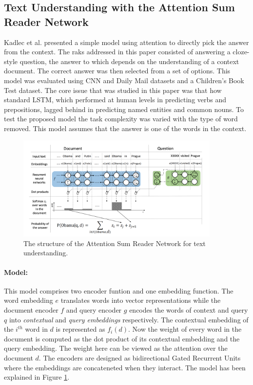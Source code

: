 \documentclass{article}
\begin{document}
\subsection{Text Understanding with the Attention Sum Reader Network}
\label{sec:kadlec}
	
	Kadlec et al. \cite{kadlec} presented a simple model using attention to directly pick the answer from the context. The raks addressed in this paper consisted of answering a cloze-style question, the answer to which depends on the understanding of a context document. The correct answer was then selected from a set of options. This model was evaluated using CNN and Daily Mail datasets and a Children's Book Test dataset. The core issue that was studied in this paper was that how standard LSTM, which performed at human levels in predicting verbs and prepositions, lagged behind in predicting named entities and common nouns. To test the proposed model the task complexity was varied with the type of word removed. This model assumes that the answer is one of the words in the context.

	\begin{figure}
		\centering
		\includegraphics[width=0.9\textwidth]{fig/atnsumrdr.png}
		\caption{The structure of the Attention Sum Reader Network for text understanding.}
		\label{fig:attnsum}
	\end{figure}
	
	\paragraph{Model: } This model comprises two encoder funtion and one embedding function. The word embedding \(e\) translates words into vector representations while the document encoder \(f\) and query  encoder \(g\) encodes the words of context and query \(q\) into \textit{contextual} and \textit{query embeddings} respectively. The contextual embedding of the \(i^{th}\) word in \(d\) is represented as \(f_i(d)\). Now the weight of every word in the document is computed as the dot product of its contextual embedding and the query embedding. The weight here can be viewed as the attention over the document \(d\). The encoders are designed as bidirectional Gated Recurrent Units where the embeddings are concateneted when they interact. The model has been explained in Figure \ref{fig:attnsum}.
	
\end{document}
